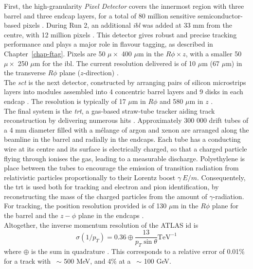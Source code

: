 First, the high-granularity \textit{Pixel Detector} covers the innermost region with three barrel and three endcap layers, for a total of 80 million sensitive semiconductor-based pixels \cite{CERN-LHCC-97-016, Potamianos:2015lar}. During Run 2, an additional \textit{\gls{ibl}} was added at 33 mm from the centre, with 12 million pixels \cite{Capeans:1291633}. This detector gives robust and precise tracking performance and plays a major role in flavour tagging, as described in Chapter~\ref{chap-ftag}. Pixels are 50 $\mu \times$ 400 $\mu$m in the $R\phi \times z$, with a smaller 50 $\mu \times$ 250 $\mu$m for the \gls{ibl}. The current resolution delivered is of 10 $\mu$m (67 $\mu$m) in the transverse $R\phi$ plane ($z$-direction) \cite{Pernegger_2015, ATL-INDET-PUB-2016-001}. \\

The \textit{\gls{sct}} is the next detector, constructed by arranging pairs of silicon microstrips layers into modules assembled into 4 concentric barrel layers and 9 disks in each endcap \cite{AHMAD200798, CERN-LHCC-2017-005}. The resolution is typically of 17 $\mu$m in $R\phi$ and 580 $\mu$m in $z$ \cite{ATLASSCT}. \\

The final system is the \textit{\gls{trt}}, a gas-based straw-tube tracker aiding track reconstruction by delivering numerous hits \cite{TheATLASTRTcollaboration_2008}. Approximately 300 000 drift tubes of a 4 mm diameter filled with a mélange of argon and xenon are arranged along the beamline in the barrel and radially in the endcaps. Each tube has a conducting wire at its centre and its surface is electrically charged, so that a charged particle flying through ionises the gas, leading to a measurable discharge. Polyethylene is place between the tubes to encourage the emission of transition radiation from relativistic particles proportionally to their Lorentz boost $\gamma ~ E / m$. Consequentely, the \gls{trt} is used both for tracking and electron and pion identification, by reconstructing the mass of the charged particles from the amount of $\gamma$-radiation. For tracking, the position resolution provided is of 130 $\mu$m in the $R\phi$ plane for the barrel and the $z-\phi$ plane in the endcaps \cite{Vogel:1537991}. \\

Altogether, the inverse momentum resolution of the ATLAS \gls{id} is
\begin{equation}
  \sigma(1 / p_T) = 0.36 \oplus \frac{13}{p_T \sin\theta} \text{TeV}^{-1}
\end{equation}
where $\oplus$ is the sum in quadrature \cite{TheATLASCollaboration_2008}. This corresponds to a relative error of 0.01\% for a track with \pt\ $\sim$ 500 MeV, and 4\% at a \pt\ $\sim$ 100 GeV. 

